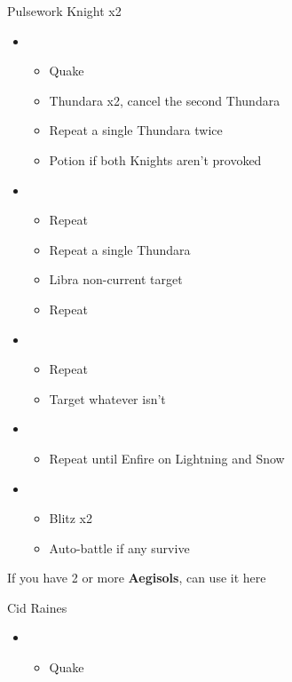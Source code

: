 \begin{multicols}{2}
\begin{battle}{Pulsework Knight x2}
\begin{itemize}
    \item \first
    \begin{itemize}
        \item Quake
        \item Thundara x2, cancel the second Thundara
        \item Repeat a single Thundara twice
        \item Potion if both Knights aren't provoked
    \end{itemize}
    \item \third
    \begin{itemize}
        \item Repeat
        \item Repeat a single Thundara
        \item Libra non-current target
        \item Repeat
    \end{itemize}
    \item \fourth
    \begin{itemize}
        \item Repeat
        \item Target whatever isn't \stagger
    \end{itemize}
    \item \fifth
    \begin{itemize}
        \item Repeat until Enfire on Lightning and Snow
    \end{itemize}
    \item \sixth
    \begin{itemize}
        \item Blitz x2
        \item Auto-battle if any survive
    \end{itemize}
\end{itemize}
\end{battle}
If you have 2 or more \textbf{Aegisols}, can use it here
\begin{battle}{Cid Raines}
\begin{itemize}
    \item \first
    \begin{itemize}
        \item Quake

\end{itemize}
\end{itemize}
\end{battle}
\end{multicols}
